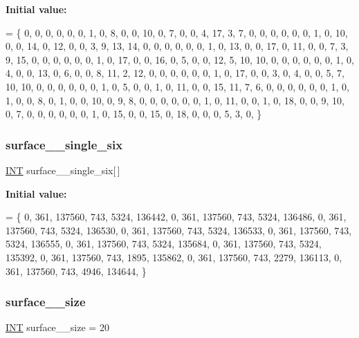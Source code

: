 {\bfseries Initial value\+:}
\begin{DoxyCode}
= \{
    0, 0, 0, 0, 0, 0, 1, 0, 8, 0, 0, 10, 0, 7, 0, 0, 4, 17, 3, 7, 
    0, 0, 0, 0, 0, 0, 1, 0, 10, 0, 0, 14, 0, 12, 0, 0, 3, 9, 13, 14, 
    0, 0, 0, 0, 0, 0, 1, 0, 13, 0, 0, 17, 0, 11, 0, 0, 7, 3, 9, 15, 
    0, 0, 0, 0, 0, 0, 1, 0, 17, 0, 0, 16, 0, 5, 0, 0, 12, 5, 10, 10, 
    0, 0, 0, 0, 0, 0, 1, 0, 4, 0, 0, 13, 0, 6, 0, 0, 8, 11, 2, 12, 
    0, 0, 0, 0, 0, 0, 1, 0, 17, 0, 0, 3, 0, 4, 0, 0, 5, 7, 10, 10, 
    0, 0, 0, 0, 0, 0, 1, 0, 5, 0, 0, 1, 0, 11, 0, 0, 15, 11, 7, 6, 
    0, 0, 0, 0, 0, 0, 1, 0, 1, 0, 0, 8, 0, 1, 0, 0, 10, 0, 9, 8, 
    0, 0, 0, 0, 0, 0, 1, 0, 11, 0, 0, 1, 0, 18, 0, 0, 9, 10, 0, 7, 
    0, 0, 0, 0, 0, 0, 1, 0, 15, 0, 0, 15, 0, 18, 0, 0, 0, 5, 3, 0, 
\}
\end{DoxyCode}
\mbox{\label{surface__19_8_c_a4b5da5f3555724184f46be87dde8bc46}} 
\subsubsection{\texorpdfstring{surface\+\_\+\_\+single\+\_\+six}{surface\_19\_single\_six}}
{\footnotesize\ttfamily \mbox{\hyperlink{galois_8h_a09fddde158a3a20bd2dcadb609de11dc}{I\+NT}} surface\+\_\+\_\+single\+\_\+six\mbox{[}$\,$\mbox{]}}

{\bfseries Initial value\+:}
\begin{DoxyCode}
= \{ 
    0, 361, 137560, 743, 5324, 136442, 
    0, 361, 137560, 743, 5324, 136486, 
    0, 361, 137560, 743, 5324, 136530, 
    0, 361, 137560, 743, 5324, 136533, 
    0, 361, 137560, 743, 5324, 136555, 
    0, 361, 137560, 743, 5324, 135684, 
    0, 361, 137560, 743, 5324, 135392, 
    0, 361, 137560, 743, 1895, 135862, 
    0, 361, 137560, 743, 2279, 136113, 
    0, 361, 137560, 743, 4946, 134644, 
\}
\end{DoxyCode}
\mbox{\label{surface__19_8_c_a335fb0dec144b06b0685783f72171abd}} 
\subsubsection{\texorpdfstring{surface\+\_\+\_\+size}{surface\_19\_size}}
{\footnotesize\ttfamily \mbox{\hyperlink{galois_8h_a09fddde158a3a20bd2dcadb609de11dc}{I\+NT}} surface\+\_\+\_\+size = 20}


